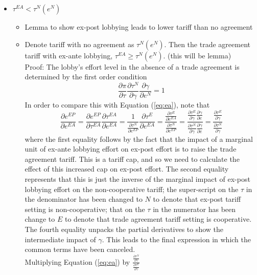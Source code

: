 \documentclass[12pt]{article}
\newcommand{\ga}{\gamma}
\begin{document}
\newpage
\begin{itemize}					
	\item $\tau^{EA} < \tau^N(e^N)$
		\begin{itemize}
			\item Lemma to show ex-post lobbying leads to lower tariff than no agreement
			\item Denote tariff with no agreement as $\tau^N(e^N)$. Then the trade agreement tariff with ex-ante lobbying, $\tau^{EA} \geq \tau^N(e^N)$. (this will be lemma) \\
			Proof: The lobby's effort level in the absence of a trade agreement is determined by the first order condition
				\begin{equation}
						\frac{\partial \pi}{\partial \tau} \frac{\partial \tau^N}{\partial \ga} \frac{\partial \ga}{\partial e^N} = 1
						\label{eq:nta}
				\end{equation}
			In order to compare this with Equation (\ref{eq:ea}), note that
			  \[
				  \frac{\partial e^{EP}}{\partial e^{EA}} = \frac{\partial e^{EP}}{\partial \tau^{EA}} \frac{\partial \tau^{EA}}{\partial e^{EA}} = \frac{1}{\frac{\partial \tau^N}{\partial e^{EP}}} \frac{\partial \tau^{E}}{\partial e^{EA}} =  \frac{\frac{\partial \tau^{E}}{\partial e^{EA}}}{\frac{\partial \tau^N}{\partial e^{EP}}} =  \frac{\frac{\partial \tau^{E}}{\partial \ga}\frac{\partial \ga}{\partial e}}{\frac{\partial \tau^N}{\partial \ga}\frac{\partial \ga}{\partial e}} =  \frac{\frac{\partial \tau^{E}}{\partial \ga}}{\frac{\partial \tau^N}{\partial \ga}} 
				\]
				where the first equality follows by the fact that the impact of a marginal unit of ex-ante lobbying effort on ex-post effort is to raise the trade agreement tariff. This is a tariff cap, and so we need to calculate the effect of this increased cap on ex-post effort. The second equality represents that this is just the inverse of the marginal impact of ex-post lobbying effort on the non-cooperative tariff; the super-script on the $\tau$ in the denominator has been changed to $N$ to denote that ex-post tariff setting is non-cooperative; that on the $\tau$ in the numerator has been change to $E$ to denote that trade agreement tariff setting is cooperative. The fourth equality unpacks the partial derivatives to show the intermediate impact of $\ga$. This leads to the final expression in which the common terms have been canceled. \\
				Multiplying Equation (\ref{eq:ea}) by $\frac{\frac{\partial \tau^N}{\partial \ga}}{\frac{\partial \tau^E}{\partial \ga}}$

\end{itemize}
\end{itemize}
\end{document}

